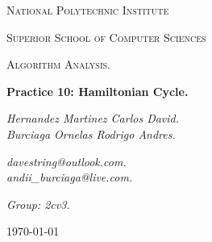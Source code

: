 \begin{titlepage}
	\centering
	{ \huge \scshape National Polytechnic Institute\par}
	{ \Large \scshape  Superior School of Computer Sciences\par }
	\vspace{1cm}
	{\scshape\Large Algorithm Analysis.\par}
	\vspace{1.5cm}
	{\Huge\bfseries Practice 10: Hamiltonian Cycle. \par}
	\vspace{2cm}
	{\Large\itshape Hernandez Martinez Carlos David. \\ Burciaga Ornelas Rodrigo Andres.\par} \hfill \break
	{\Large\itshape davestring@outlook.com. \\ andii\_burciaga@live.com.\par} \hfill \break
	{\Large\itshape Group: 2cv3. \par}
	\vfill
	{\large \today\par} 
	\vfill
\end{titlepage}

\renewcommand\lstlistingname{Quelltext} 



\tableofcontents 
{}
\pagebreak